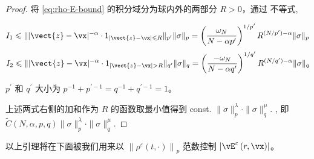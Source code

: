 \begin{proof}
    将 \eqref{eq:rho-E-bound} 的积分域分为球内外的两部分 $R>0$，通过  \Holder 不等式,
    
$$
I_{1} \leqslant  \| |\vect{z}-\vx|^{-\alpha}\cdot 1_{|\vect{z}-\vx|\leqslant R}\|_{p^{\prime}} \|\sigma\|_{p}
= \left(\frac{\omega_N}{N-\alpha p^\prime}\right)^{1/p^\prime} R^{(N / p^{\prime})-\alpha} \|\sigma\|_{p}
$$
$$
I_{2} \leqslant  \| |\vect{z}-\vx|^{-\alpha}\cdot 1_{|\vect{z}-\vx|> R}\|_{q^{\prime}} \|\sigma\|_{q}
= \left(\frac{-\omega_N}{N-\alpha q^\prime}\right)^{1/q^\prime} R^{(N / q^{\prime})-\alpha} \|\sigma\|_{q}
$$

$p^{\prime}$ 和 $q^{\prime}$ 大小为 $p^{-1}+p^{\prime-1}=q^{-1}+q^{\prime-1}=1$。

上述两式右侧的加和作为 $R$ 的函数取最小值得到 const. $\|\sigma\|_{p}^{\lambda} \cdot\|\sigma\|_{q}^{\mu} .$ , 即 $\tilde{C}(N,\alpha, p, q)\|\sigma\|_{p}^{\lambda} \cdot\|\sigma\|_{q}^{\mu}  $.
\end{proof}

以上引理将在下面被我们用来以 $\left\| \rho^{\varepsilon}(t, \cdot)\right\|_{p}$ 范数控制 $\left|\vE^{\varepsilon}\left(r, \vx\right)\right|$。






